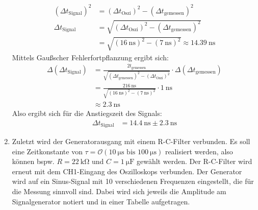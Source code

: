 \documentclass{article}
\begin{document}
\begin{enumerate}[label=\alph*]
\begin{align*}
             (\Delta t_\mathrm{Signal})^2 &= (\Delta t_\mathrm{Oszi})^2 - (\Delta t_\mathrm{gemessen})^2 \\
             \Delta t_\mathrm{Signal} &= \sqrt{(\Delta t_\mathrm{Oszi})^2 - (\Delta t_\mathrm{gemessen})^2} \\
             &= \sqrt{(\SI{16}{\nano\second})^2 - (\SI{7}{\nano\second})^2} \approx \SI{14.39}{\nano\second}
         \end{align*}
         Mittels Gaußscher Fehlerfortpflanzung ergibt sich:
         \begin{align*}
             \Delta(\Delta t_\mathrm{Signal}) &= \frac{2 t_\mathrm{gemessen}}{\sqrt{(\Delta t_\mathrm{gemessen})^2 - (\Delta t_\mathrm{Oszi})^2}} \cdot \Delta(\Delta t_\mathrm{gemessen}) \\
             &= \frac{2 \SI{16}{\nano\second}}{\sqrt{(\SI{16}{\nano\second})^2 - (\SI{7}{\nano\second})^2}} \cdot \SI{1}{\nano\second} \\
             &\approx \SI{2.3}{\nano\second}
         \end{align*}
         Also ergibt sich für die Anstiegszeit des Signals:
         \begin{align*}
             \Delta t_\mathrm{Signal} &= \SI{14.4}{\nano\second} \pm \SI{2.3}{\nano\second}
         \end{align*}

         \item Zuletzt wird der Generatorausgang mit einem R-C-Filter verbunden. Es soll eine 
         Zeitkonstante von $\tau = \mathcal{O}(\SI{10}{\micro\second} \text{ bis } \SI{100}{\micro\second})$ realisiert werden, also können 
         bspw. $R = \SI{22}{\kilo\ohm}$ und $C = \SI{1}{\micro\farad}$ gewählt werden. 
         Der R-C-Filter wird erneut mit dem CH1-Eingang des Oszilloskops verbunden. 
         Der Generator wird auf ein Sinus-Signal mit 10 verschiedenen Frequenzen eingestellt, die 
         für die Messung sinnvoll sind.  
         Dabei wird sich jeweils die Amplitude am Signalgenerator notiert und in einer Tabelle aufgetragen. 


\end{enumerate}
\end{document}
